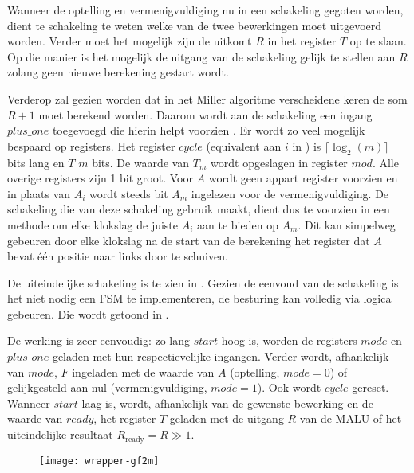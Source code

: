 Wanneer de optelling en vermenigvuldiging nu in een schakeling gegoten worden, dient te schakeling te weten welke van de twee bewerkingen moet uitgevoerd worden. Verder moet het mogelijk zijn de uitkomt $R$ in het register $T$ op te slaan. Op die manier is het mogelijk de uitgang van de schakeling gelijk te stellen aan $R$ zolang geen nieuwe berekening gestart wordt.  

Verderop zal gezien worden dat in het Miller algoritme verscheidene keren de som $R + 1$ moet berekend worden. Daarom wordt aan de schakeling een ingang $plus\_one$ toegevoegd die hierin helpt voorzien	. Er wordt zo veel mogelijk bespaard op registers. Het register $cycle$ (equivalent aan $i$ in ) is $\lceil \log _2 (m) \rceil$ bits lang en $T$ $m$ bits. De waarde van $T_m$ wordt opgeslagen in register $mod$.  Alle overige registers zijn 1 bit groot. Voor $A$ wordt geen appart register voorzien en in plaats van $A_i$ wordt steeds bit $A_m$ ingelezen voor de vermenigvuldiging. De schakeling die van deze schakeling gebruik maakt, dient dus te voorzien in een methode om elke klokslag de juiste $A_i$ aan te bieden op $A_m$. Dit kan simpelweg gebeuren door elke klokslag na de start van de berekening het register dat $A$ bevat \'e\'en positie naar links door te schuiven.

 De uiteindelijke schakeling is te zien in . Gezien de eenvoud van de schakeling is het niet nodig een FSM te implementeren, de besturing kan volledig via logica gebeuren. Die wordt getoond in .

De werking is zeer eenvoudig: zo lang $start$ hoog is, worden de registers $mode$ en $plus\_one$ geladen met hun respectievelijke ingangen. Verder wordt, afhankelijk van $mode$, $F$ ingeladen met de waarde van $A$ (optelling, $mode = 0$) of gelijkgesteld aan nul (vermenigvuldiging, $mode = 1$). Ook wordt $cycle$ gereset. Wanneer $start$ laag is, wordt, afhankelijk van de gewenste bewerking en de waarde van $ready$, het register $T$ geladen met de uitgang $R$ van de MALU of het uiteindelijke resultaat $R_{\text{ready}} = R \gg 1$.

\begin{figure}[h]
	\begin{center}
		\texttt{[image: wrapper-gf2m]}
		\label{figuur-implementatie-wrapper-gf2m}
	\end{center}
\end{figure}


